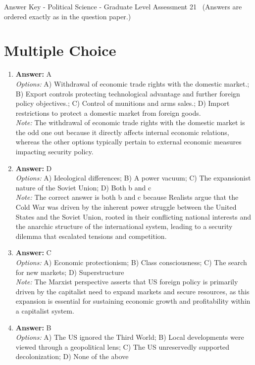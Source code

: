 \documentclass[12pt]{article}
\begin{document}
\begin{center}
Answer Key - Political Science - Graduate Level Assessment 21 \
\small (Answers are ordered exactly as in the question paper.)
\end{center}

\section*{Multiple Choice}
\begin{enumerate}[label=\arabic*.]
\item \textbf{Answer:} A
\\ \textit{Options:} A) Withdrawal of economic trade rights with the domestic market.; B) Export controls protecting technological advantage and further foreign policy objectives.; C) Control of munitions and arms sales.; D) Import restrictions to protect a domestic market from foreign goods.
\\ \textit{Note:} The withdrawal of economic trade rights with the domestic market is the odd one out because it directly affects internal economic relations, whereas the other options typically pertain to external economic measures impacting security policy.
\item \textbf{Answer:} D
\\ \textit{Options:} A) Ideological differences; B) A power vacuum; C) The expansionist nature of the Soviet Union; D) Both b and c
\\ \textit{Note:} The correct answer is both b and c because Realists argue that the Cold War was driven by the inherent power struggle between the United States and the Soviet Union, rooted in their conflicting national interests and the anarchic structure of the international system, leading to a security dilemma that escalated tensions and competition.
\item \textbf{Answer:} C
\\ \textit{Options:} A) Economic protectionism; B) Class consciousness; C) The search for new markets; D) Superstructure
\\ \textit{Note:} The Marxist perspective asserts that US foreign policy is primarily driven by the capitalist need to expand markets and secure resources, as this expansion is essential for sustaining economic growth and profitability within a capitalist system.
\item \textbf{Answer:} B
\\ \textit{Options:} A) The US ignored the Third World; B) Local developments were viewed through a geopolitical lens; C) The US unreservedly supported decolonization; D) None of the above

\end{enumerate}
\end{document}
